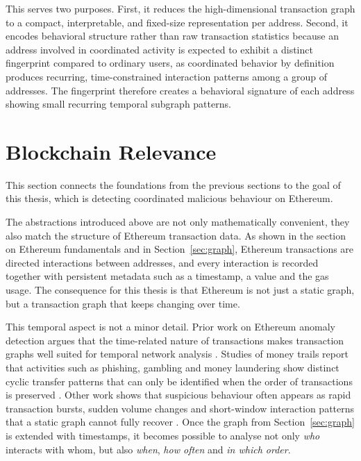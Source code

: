 \documentclass{thesisclass}
\begin{document}
This serves two purposes. First, it reduces the high-dimensional transaction graph to a compact, interpretable, and fixed-size representation per address. Second, it encodes behavioral structure rather than raw transaction statistics because an address involved in coordinated activity is expected to exhibit a distinct fingerprint compared to ordinary users, as coordinated behavior by definition produces recurring, time-constrained interaction patterns among a group of addresses. The fingerprint therefore creates a behavioral signature of each address showing small recurring temporal subgraph patterns.

\section{Blockchain Relevance}
\label{sec:blockchain_relevance}

This section connects the foundations from the previous sections to the goal of this thesis, which is detecting coordinated malicious behaviour on Ethereum.

The abstractions introduced above are not only mathematically convenient, they also match the structure of Ethereum transaction data. As shown in the section on Ethereum fundamentals and in Section~\ref{sec:graph}, Ethereum transactions are directed interactions between addresses, and every interaction is recorded together with persistent metadata such as a timestamp, a value and the gas usage. The consequence for this thesis is that Ethereum is not just a static graph, but a transaction graph that keeps changing over time.

This temporal aspect is not a minor detail. Prior work on Ethereum anomaly detection argues that the time-related nature of transactions makes transaction graphs well suited for temporal network analysis \cite{pohlmann2019anomaly}. Studies of money trails report that activities such as phishing, gambling and money laundering show distinct cyclic transfer patterns that can only be identified when the order of transactions is preserved \cite{lal2021money}. Other work shows that suspicious behaviour often appears as rapid transaction bursts, sudden volume changes and short-window interaction patterns that a static graph cannot fully recover \cite{temporal_sampling_ethereum, ghoshcatalog2025}. Once the graph from Section~\ref{sec:graph} is extended with timestamps, it becomes possible to analyse not only \emph{who} interacts with whom, but also \emph{when}, \emph{how often} and \emph{in which order}.
\end{document}
